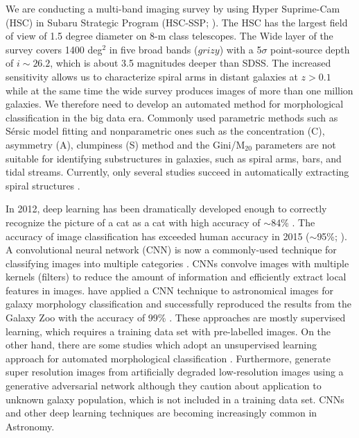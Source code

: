 \documentclass[a4paper,fleqn,usenatbib]{mnras}
\begin{document}
We are conducting a multi-band imaging survey by using Hyper Suprime-Cam (HSC) in Subaru Strategic Program (HSC-SSP; \citealt{2018PASJ...70S...4A}).
The HSC has the largest field of view of 1.5 degree diameter on 8-m class telescopes.
The Wide layer of the survey covers 1400 deg$^2$ in five broad bands ($grizy$) with a 5$\sigma$ point-source depth of $i\sim26.2$, which is about 3.5 magnitudes deeper than SDSS. 
The increased sensitivity allows us to characterize spiral arms in distant galaxies at $z>0.1$ while at the same time the wide survey produces images of more than one million galaxies.
We therefore need to develop an automated method for morphological classification in the big data era.
Commonly used parametric methods such as S\'{e}rsic model fitting \citep[e.g.,][]{2010AJ....139.2097P} and nonparametric ones such as the concentration (C), asymmetry (A), clumpiness (S) method and the Gini/M$_{20}$ parameters \citep[e.g.,][]{2014ARA&A..52..291C} are not suitable for identifying substructures in galaxies, such as spiral arms, bars, and tidal streams.
Currently, only several studies succeed in automatically extracting spiral structures \citep{2014ApJ...790...87D, 2016ApJS..223...20K,2017MNRAS.472.2263H}.


In 2012, deep learning has been dramatically developed enough to correctly recognize the picture of a cat as a cat with high accuracy of $\sim$84\% \citep{NIPS2012_4824}.
The accuracy of image classification has exceeded human accuracy in 2015 ($\sim$95\%; \citealt{HeZRS16}).
A convolutional neural network (CNN) is now a commonly-used technique for classifying images into multiple categories \citep[e.g.,][]{Fukushima...1980,LeCun...1998, ILSVRC15}.
CNNs convolve images with multiple kernels (filters) to reduce the amount of information and efficiently extract local features in images.
\cite{2015MNRAS.450.1441D} have applied a CNN technique to astronomical images for galaxy morphology classification and successfully reproduced the results from the Galaxy Zoo with the accuracy of 99\% \citep[see also e.g., ][]{2015ApJS..221....8H, 2018MNRAS.476.3661D, 2018MNRAS.477..894A}.
These approaches are mostly supervised learning, which requires a training data set with pre-labelled images.
On the other hand, there are some studies which adopt an unsupervised learning approach for automated morphological classification \citep[e.g.,][]{2018MNRAS.473.1108H, 2019arXiv190910537M}.
Furthermore, \cite{2017MNRAS.467L.110S} generate super resolution images from artificially degraded low-resolution images using a generative adversarial network \citep{NIPS2014_5423} although they caution about application to unknown galaxy population, which is not included in a training data set.
CNNs and other deep learning techniques are becoming increasingly common in Astronomy.
\end{document}
